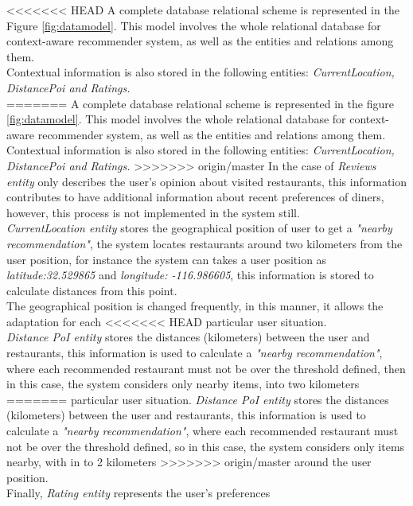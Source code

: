 <<<<<<< HEAD
A complete database relational scheme is represented in the 
Figure  \ref{fig:datamodel}. This model involves the whole relational 
database for context-aware recommender system, as well as 
the entities and relations among them. \\
Contextual information is also stored in the following entities:
\textit{CurrentLocation, DistancePoi and Ratings.} \\ 
=======
A complete database relational scheme is represented in the figure
\ref{fig:datamodel}. This model involves the whole relational database for
context-aware recommender system, as well as the entities and
relations among them. \\
Contextual information is also stored in the following entities:
\textit{CurrentLocation, DistancePoi and Ratings.} 
>>>>>>> origin/master
In the case of \textit{Reviews entity}  only describes the user's 
opinion about visited restaurants, this information contributes to 
have additional information about recent preferences of diners, 
however, this process is not implemented in the system still. \\
\textit{CurrentLocation entity} stores the geographical position of
user to get a \textit{"nearby recommendation"}, the system locates
restaurants around two kilometers from the user position, for instance
the system can takes a user position as \textit{latitude:32.529865}
and \textit{longitude: -116.986605}, this information is stored to
calculate distances from this point. \\ The geographical position is
changed frequently, in this manner, it allows the adaptation for each
<<<<<<< HEAD
particular user situation. \\ \textit{Distance PoI entity} stores the
distances (kilometers) between the user and restaurants, this
information is used to calculate a \textit{"nearby recommendation"},
where each recommended restaurant must not be over the threshold defined, 
then in this case, the system considers only nearby items, into two kilometers 
=======
particular user situation. \textit{Distance PoI entity} stores the
distances (kilometers) between the user and restaurants, this
information is used to calculate a \textit{"nearby recommendation"},
where each recommended restaurant must not be over the threshold defined, 
so in this case, the system considers only items nearby, with in to 2 kilometers 
>>>>>>> origin/master
around the user position.\\
Finally, \textit{Rating entity} represents the user's preferences  
